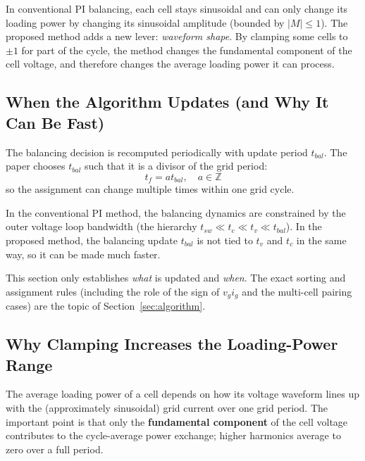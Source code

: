 \documentclass[12pt, a4paper]{article}
\def\,{ }%
\newcommand{\vg}{v_{g}}
\newcommand{\ig}{i_{g}}
\begin{document}
\begin{physbox}
In conventional PI balancing, each cell stays sinusoidal and can only change its
loading power by changing its sinusoidal amplitude (bounded by $|M|\le 1$).
The proposed method adds a new lever: \emph{waveform shape}.
By clamping some cells to $\pm 1$ for part of the cycle, the method changes the
fundamental component of the cell voltage, and therefore changes the average
loading power it can process.
\end{physbox}

\subsection{When the Algorithm Updates (and Why It Can Be Fast)}
\label{subsec:implementation_overview}

The balancing decision is recomputed periodically with update period $t_{bal}$.
The paper chooses $t_{bal}$ such that it is a divisor of the grid period:
\[
t_f = a\,t_{bal}, \quad a \in \mathbb{Z}
\]
so the assignment can change multiple times within one grid cycle.

\begin{statebox}
In the conventional PI method, the balancing dynamics are constrained by the
outer voltage loop bandwidth (the hierarchy $t_{sw} \ll t_c \ll t_v \ll t_{bal}$).
In the proposed method, the balancing update $t_{bal}$ is not tied to $t_v$ and
$t_c$ in the same way, so it can be made much faster.
\end{statebox}

This section only establishes \emph{what} is updated and \emph{when}.
The exact sorting and assignment rules (including the role of the sign of
$\vg\ig$ and the multi-cell pairing cases) are the topic of
Section~\ref{sec:algorithm}.

\subsection{Why Clamping Increases the Loading-Power Range}
\label{subsec:capability}

The average loading power of a cell depends on how its voltage waveform lines up
with the (approximately sinusoidal) grid current over one grid period.
The important point is that only the \textbf{fundamental component} of the cell
voltage contributes to the cycle-average power exchange; higher harmonics average
to zero over a full period.
\end{document}
